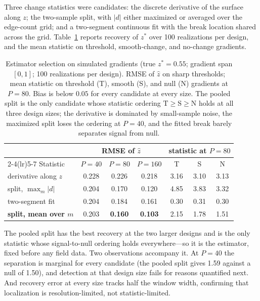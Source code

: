 \documentclass[review,12pt,authoryear]{elsarticle}
\theoremstyle{remark}
\begin{document}
Three change statistics were candidates: the discrete derivative of the surface
along $z$; the two-sample split, with $|d|$ either maximized or averaged over
the edge-count grid; and a two-segment continuous fit with the break location
shared across the grid. Table~\ref{tab:est} reports recovery of $z^\ast$ over
100 realizations per design, and the mean statistic on threshold,
smooth-change, and no-change gradients.

\begin{table}[t]
\centering
\caption{Estimator selection on simulated gradients (true $z^\ast = 0.55$;
gradient span $[0,1]$; 100 realizations per design). RMSE of $\hat z$ on
sharp thresholds; mean statistic on threshold (T), smooth (S), and null (N)
gradients at $P=80$. Bias is below $0.05$ for every candidate at every size.
The pooled split is the only candidate whose statistic ordering
$\mathrm{T} \ge \mathrm{S} \ge \mathrm{N}$ holds at all three design
sizes; the derivative is dominated by small-sample noise, the maximized
split loses the ordering at $P = 40$, and the fitted break barely separates
signal from null.}
\label{tab:est}
\begin{tabular}{lcccccc}
\toprule
 & \multicolumn{3}{c}{RMSE of $\hat z$}
 & \multicolumn{3}{c}{statistic at $P=80$} \\
\cmidrule(lr){2-4}\cmidrule(lr){5-7}
Statistic & $P=40$ & $P=80$ & $P=160$ & T & S & N \\
\midrule
derivative along $z$        & 0.228 & 0.226 & 0.218 & 3.16 & 3.10 & 3.13 \\
split, $\max_m |d|$          & 0.204 & 0.170 & 0.120 & 4.85 & 3.83 & 3.32 \\
two-segment fit             & 0.204 & 0.184 & 0.161 & 0.30 & 0.31 & 0.30 \\
\textbf{split, mean over $m$} & 0.203 & \textbf{0.160} & \textbf{0.103}
                            & 2.15 & 1.78 & 1.51 \\
\bottomrule
\end{tabular}
\end{table}

The pooled split has the best recovery at the two larger designs and is the
only statistic whose signal-to-null ordering holds everywhere---so it is
the estimator, fixed before any field data. Two observations
accompany it. At $P = 40$ the separation is marginal for every candidate
(the pooled split gives 1.59 against a null of 1.50), and detection at that
design size fails for reasons quantified next. And recovery error at every
size tracks half the window width, confirming that localization is
resolution-limited, not statistic-limited.
\end{document}
